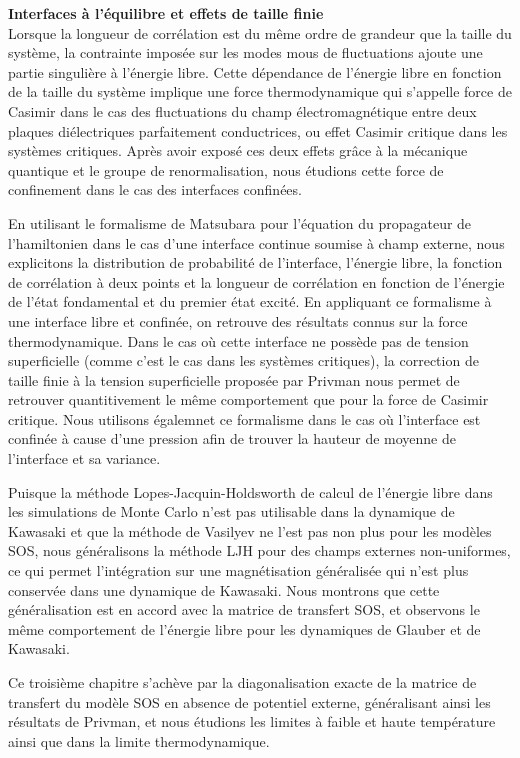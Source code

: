 {\bf \large Interfaces à l'équilibre et effets de taille finie} \\

Lorsque la longueur de corrélation est du même ordre de grandeur que la taille du système, la contrainte imposée sur les modes mous de fluctuations ajoute une partie singulière à l'énergie libre. Cette dépendance de l'énergie libre en fonction de la taille du système implique une force thermodynamique qui s'appelle force de Casimir dans le cas des fluctuations du champ électromagnétique entre deux plaques diélectriques parfaitement conductrices, ou effet Casimir critique dans les systèmes critiques. Après avoir exposé ces deux effets grâce à la mécanique quantique et le groupe de renormalisation, nous étudions cette force de confinement dans le cas des interfaces confinées. 

En utilisant le formalisme de Matsubara pour l'équation du propagateur de l'hamiltonien dans le cas d'une interface continue soumise à champ externe, nous explicitons la distribution de probabilité de l'interface, l'énergie libre, la fonction de corrélation à deux points et la longueur de corrélation en fonction de l'énergie de l'état fondamental et du premier état excité. En appliquant ce formalisme à une interface libre et confinée, on retrouve des résultats connus sur la force thermodynamique. Dans le cas où cette interface ne possède pas de tension superficielle (comme c'est le cas dans les systèmes critiques), la correction de taille finie à la tension superficielle proposée par Privman nous permet de retrouver quantitivement le même comportement que pour la force de Casimir critique. Nous utilisons égalemnet ce formalisme dans le cas où l'interface est confinée à cause d'une pression afin de trouver la hauteur de moyenne de l'interface et sa variance.

Puisque la méthode Lopes-Jacquin-Holdsworth de calcul de l'énergie libre dans les simulations de Monte Carlo n'est pas utilisable dans la dynamique de Kawasaki et que la méthode de Vasilyev ne l'est pas non plus pour les modèles SOS, nous généralisons la méthode LJH pour des champs externes non-uniformes, ce qui permet l'intégration sur une magnétisation généralisée qui n'est plus conservée dans une dynamique de Kawasaki. Nous montrons que cette généralisation est en accord avec la matrice de transfert SOS, et observons le même comportement de l'énergie libre pour les dynamiques de Glauber et de Kawasaki.

Ce troisième chapitre s'achève par la diagonalisation exacte de la matrice de transfert du modèle SOS en absence de potentiel externe, généralisant ainsi les résultats de Privman, et nous étudions les limites à faible et haute température ainsi que dans la limite thermodynamique.\\

